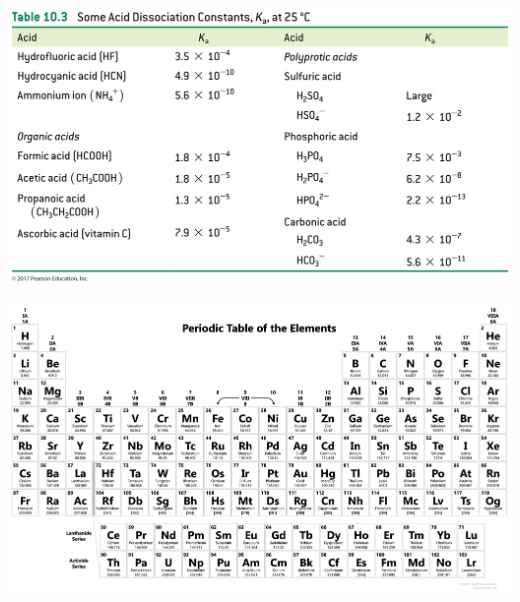 \documentclass[12pt, letterpaper]{memoir}
\begin{document}
	\vspace{4em}
	
	\noindent\includegraphics[width=\textwidth]{10_03_Table}
	


\hspace{6em}	\includegraphics[width=1.3\textwidth, angle =90]{UpdatedTable}

	\restoregeometry

	
\end{document}
